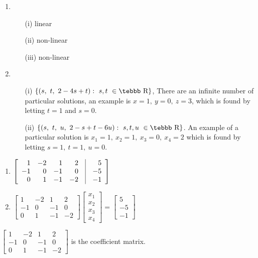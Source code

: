 \noindent {\bf \ref{ssec.lineq}:}
\begin{enumerate} \item \begin{enumerate}
\item[(i)] linear
\item[(ii)] non-linear
\item[(iii)] non-linear
\end{enumerate}
\item \begin{enumerate}
\item[(i)] $\{(s, \ t, \ 2-4s+t): \ s,t  \ \in \mbox{\tebbb R}\}$,
There are an infinite number of particular solutions, an example
is $x=1,\ y=0,\ z=3$, which is found by letting $t=1$ and $s=0$.
\item[(ii)] $\{(s, \ t, \ u, \ 2-s+t-6u): \ s,t,u  \ \in \mbox{\tebbb
R}\}$. An example of a particular solution is
$x_1=1, \ x_2=1, \ x_3=0,\ x_4=2$ which is found by letting
$s=1,\ t=1,\ u=0$.
\end{enumerate}
\end{enumerate}

\noindent {\bf \ref{ssec.mlinsys}}
\begin{enumerate}
\item $\left [ \begin{array}{rrrrcr}
                    1&-2&1&2&\vline&5 \\
                    -1&0&-1&0&\vline&-5 \\
                    0&1&-1&-2&\vline&-1 \end{array} \right ]$

\item $\left[ \begin{array}{rrrr}
1&-2&1&2 \\ -1&0&-1&0 \\ 0&1&-1&-2 \end{array} \right]
\left[\begin{array}{r} x_1 \\ x_2 \\ x_3 \\ x_4
\end{array} \right]=\left[ \begin{array}{r} 5 \\ -5 \\ -1
\end{array} \right]$

\end{enumerate}
$\left[ \begin{array}{rrrr} 1&-2&1&2 \\ -1&0&-1&0 \\ 0&1&-1&-2
\end{array} \right]$ is the coefficient matrix.


